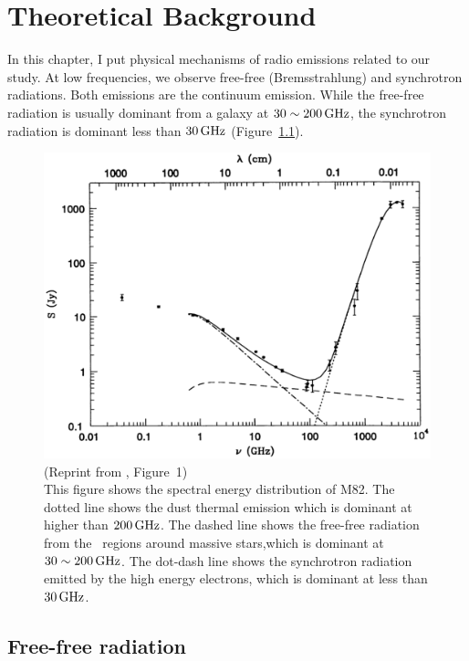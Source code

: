 \chapter{Theoretical Background}\label{chap:theory}
\begin{chapabstract}

    In this chapter, I put physical mechanisms of radio emissions related to our study.
    At low frequencies, we observe free-free (Bremsstrahlung) and synchrotron radiations.
    Both emissions are the continuum emission.
    While the free-free radiation is usually dominant from a galaxy at $30 \sim 200\,\mathrm{GHz}$, the synchrotron radiation is dominant less than $30\,\mathrm{GHz}$ (Figure~\ref{fig:Condon1992_figure1}).
\begin{figure}[htbp]
	\centering
	\includegraphics[width=.7\linewidth]{Chapter_2/Figures/Condon1992_Figure1.png}
    \caption[Reprint from \citet{Condon1992a} (Figure~1)]{\label{fig:Condon1992_figure1}
        (Reprint from \citet{Condon1992a}, Figure~1)\\
        This figure shows the spectral energy distribution of M82.
        The dotted line shows the dust thermal emission which is dominant at higher than $200\,\mathrm{GHz}$.
        The dashed line shows the free-free radiation from the \ih~regions around massive stars,which is dominant at $30 \sim 200\,\mathrm{GHz}$.
        The dot-dash line shows the synchrotron radiation emitted by the high energy electrons, which is dominant at less than $30\,\mathrm{GHz}$.
    }
\end{figure}

\end{chapabstract}



\section{Free-free radiation}

